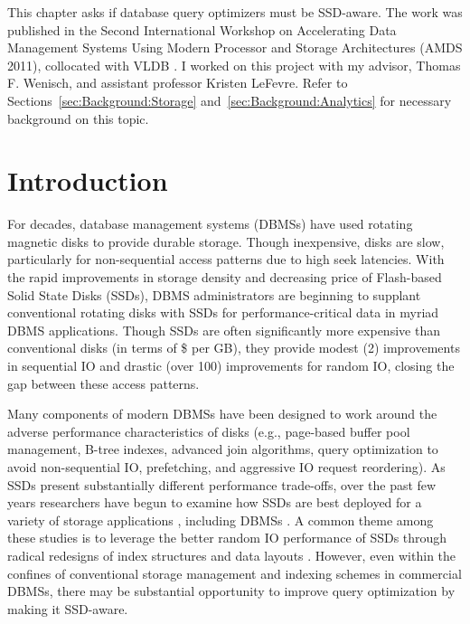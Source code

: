 This chapter asks if database query optimizers must be SSD-aware.
The work was published in the Second International Workshop on Accelerating Data Management Systems Using Modern Processor and Storage Architectures (AMDS 2011), collocated with VLDB \cite{PelleyWenisch11}.
I worked on this project with my advisor, Thomas F. Wenisch, and assistant professor Kristen LeFevre.
Refer to Sections~\ref{sec:Background:Storage} and~\ref{sec:Background:Analytics} for necessary background on this topic.

\section{Introduction}
\label{sec:FlashOpti:Intro}

For decades, database management systems (DBMSs) have used rotating magnetic disks to provide durable storage.
Though inexpensive, disks are slow, particularly for non-sequential access patterns due to high seek latencies.
With the rapid improvements in storage density and decreasing price of Flash-based Solid State Disks (SSDs), DBMS administrators are beginning to supplant conventional rotating disks with SSDs for performance-critical data in myriad DBMS applications.
Though SSDs are often significantly more expensive than conventional disks (in terms of \$ per GB), they provide modest (2\texttimes) improvements in sequential IO and drastic (over 100\texttimes) improvements for random IO, closing the gap between these access patterns.

Many components of modern DBMSs have been designed to work around the adverse performance characteristics of disks (e.g., page-based buffer pool management, B-tree indexes, advanced join algorithms, query optimization to avoid non-sequential IO, prefetching, and aggressive IO request reordering).  
As SSDs present substantially different performance trade-offs, over the past few years researchers have begun to examine how SSDs are best deployed for a variety of storage applications \cite{Bouganim09uflip:understanding, Chen2009}, including DBMSs \cite{Lee2008, Yin2009, Li2009, Baumann2010, Tsirogiannis2009}.  
A common theme among these studies is to leverage the better random IO performance of SSDs through radical redesigns of index structures \cite{Yin2009, Li2009} and data layouts \cite{Baumann2010, Tsirogiannis2009}. 
However, even within the confines of conventional storage management and indexing schemes in commercial DBMSs, there may be substantial opportunity to improve query optimization by making it SSD-aware.

